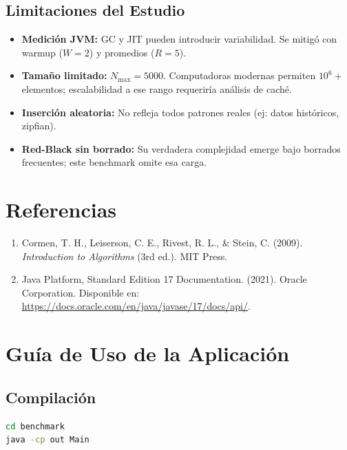 \documentclass[12pt,a4paper]{article}
\begin{document}
\subsection{Limitaciones del Estudio}

\begin{itemize}
    \item \textbf{Medición JVM:} GC y JIT pueden introducir variabilidad. Se mitigó con warmup ($W=2$) y promedios ($R=5$).
    \item \textbf{Tamaño limitado:} $N_{\max} = 5000$. Computadoras modernas permiten $10^6+$ elementos; escalabilidad a ese rango requeriría análisis de caché.
    \item \textbf{Inserción aleatoria:} No refleja todos patrones reales (ej: datos históricos, zipfian).
    \item \textbf{Red-Black sin borrado:} Su verdadera complejidad emerge bajo borrados frecuentes; este benchmark omite esa carga.
\end{itemize}

\section{Referencias}

\begin{enumerate}

    \item Cormen, T. H., Leiserson, C. E., Rivest, R. L., \& Stein, C. (2009). \textit{Introduction to Algorithms} (3rd ed.). MIT Press.

    \item Java Platform, Standard Edition 17 Documentation. (2021). Oracle Corporation.
    \newline Disponible en: \url{https://docs.oracle.com/en/java/javase/17/docs/api/}.

\end{enumerate}

\appendix

\section{Guía de Uso de la Aplicación}

\subsection{Compilación}

\begin{lstlisting}[language=bash]
cd benchmark
java -cp out Main
\end{lstlisting}
\end{document}
